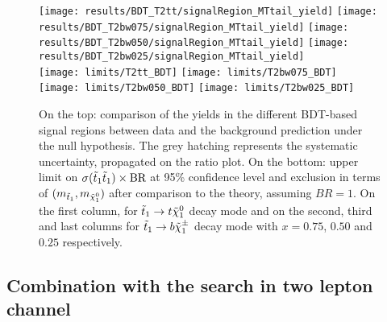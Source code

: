     \begin{landscape}
        \thispagestyle{empty}
        \vspace*{1cm}
    \begin{figure}[h!]
        \centering
        \texttt{[image: results/BDT\_T2tt/signalRegion\_MTtail\_yield]}
        \texttt{[image: results/BDT\_T2bw075/signalRegion\_MTtail\_yield]}
        \texttt{[image: results/BDT\_T2bw050/signalRegion\_MTtail\_yield]}
        \texttt{[image: results/BDT\_T2bw025/signalRegion\_MTtail\_yield]}\\
        \texttt{[image: limits/T2tt\_BDT]}
        \texttt{[image: limits/T2bw075\_BDT]}
        \texttt{[image: limits/T2bw050\_BDT]}
        \texttt{[image: limits/T2bw025\_BDT]}
        \caption{On the top: comparison of the yields in the different BDT-based signal
        regions between data and the background prediction under the null hypothesis. The
        grey hatching represents the systematic uncertainty, propagated on the ratio plot.
        On the bottom: upper limit on $\sigma(\tilde{t}_1\tilde{t}_1) \times \text{BR}$ at 95\% confidence level and exclusion in terms of
        $(m_{\tilde{t}_1},m_{\tilde{\chi}_1^0})$ after comparison to the theory, assuming
        $BR = 1$. On the first column, for $\tilde{t}_1 \rightarrow t \tilde{\chi}_1^0$ decay mode and on
        the second, third and last columns for $\tilde{t}_1 \rightarrow b \tilde{\chi}_1^\pm$ decay mode
        with $x=0.75$, $0.50$ and $0.25$ respectively.}
        \label{fig:resultsBDT}
    \end{figure}
    \end{landscape}
    \restoregeometry

    \subsection{Combination with the search in two lepton channel}

